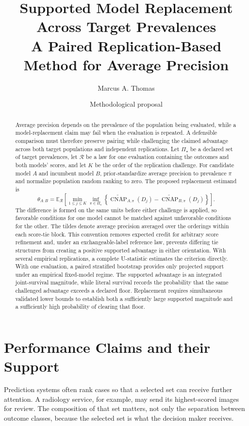 \documentclass[11pt]{article}
\title{Supported Model Replacement Across Target Prevalences\\
\large A Paired Replication-Based Method for Average Precision}
\author{Marcus A. Thomas}
\date{Methodological proposal}
\newcommand{\CNAP}{\operatorname{CNAP}}
\newcommand{\Regime}{\mathcal{R}}
\newcommand{\PSet}{\Pi_\star}
\newcommand{\E}{\mathbb{E}}
\theoremstyle{remark}
\begin{document}
\maketitle

\begin{abstract}
Average precision depends on the prevalence of the population being evaluated, while a model-replacement claim may fail when the evaluation is repeated. A defensible comparison must therefore preserve pairing while challenging the claimed advantage across both target populations and independent replications. Let $\PSet$ be a declared set of target prevalences, let $\Regime$ be a law for one evaluation containing the outcomes and both models' scores, and let $K$ be the order of the replication challenge. For candidate model $A$ and incumbent model $B$, prior-standardize average precision to prevalence $\pi$ and normalize population random ranking to zero. The proposed replacement estimand is
\[
\theta_{A:B}
=
\E_{\Regime}\left[
\min_{1\leq j\leq K}
\inf_{\pi\in\PSet}
\left\{
\widetilde{\CNAP}_{A,\pi}(D_j)
-
\widetilde{\CNAP}_{B,\pi}(D_j)
\right\}
\right].
\]
The difference is formed on the same units before either challenge is applied, so favorable conditions for one model cannot be matched against unfavorable conditions for the other. The tildes denote average precision averaged over the orderings within each score-tie block. This convention removes expected credit for arbitrary score refinement and, under an exchangeable-label reference law, prevents differing tie structures from creating a positive supported advantage in either orientation. With several empirical replications, a complete U-statistic estimates the criterion directly. With one evaluation, a paired stratified bootstrap provides only projected support under an empirical fixed-model regime. The supported advantage is an integrated joint-survival magnitude, while literal survival records the probability that the same challenged advantage exceeds a declared floor. Replacement requires simultaneous validated lower bounds to establish both a sufficiently large supported magnitude and a sufficiently high probability of clearing that floor.
\end{abstract}


\section{Performance Claims and their Support}
\label{sec:introduction}

Prediction systems often rank cases so that a selected set can receive further
attention. A radiology service, for example, may send its highest-scored images
for review. The composition of that set matters, not only the separation
between outcome classes, because the selected set is what the decision maker
receives.
\end{document}
